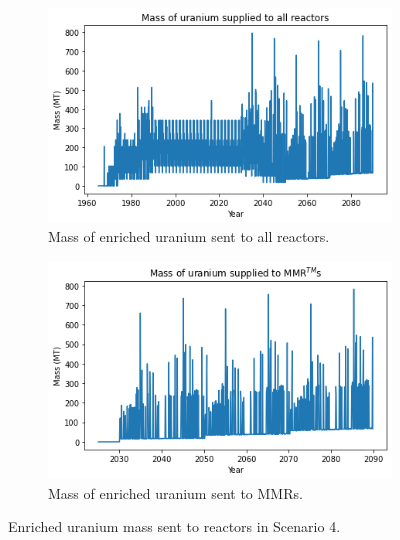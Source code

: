 \begin{figure}
    \centering
    \begin{subfigure}{0.45\textwidth}
        \centering
        \includegraphics[scale=0.4]{../figures/fuelsupply_scenarios_4.png}
        \caption{Mass of enriched uranium sent to all reactors.}
        \label{fig:totalfuel_4}
    \end{subfigure}
    \hspace{0.8cm}
    \begin{subfigure}{0.45\textwidth}
        \centering
        \includegraphics[scale=0.4]{../figures/advancedRX_fuelsupply_scenarios_4.png}
        \caption{Mass of enriched uranium sent to \glspl{MMR}.}
        \label{fig:haleu_4}
    \end{subfigure}
    \caption{Enriched uranium mass sent to reactors in Scenario 4.}
    \label{fig:fuel_4}
\end{figure}

